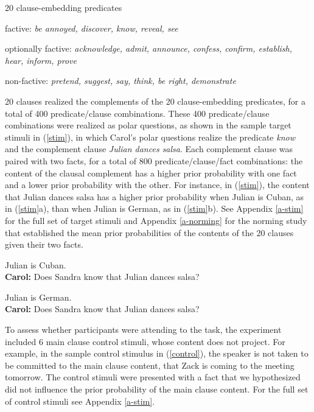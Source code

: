 \documentclass[11pt,fleqn]{article}
\newcommand{\6}{\mbox{$[\hspace*{-.6mm}[$}}
\newcommand{\9}{\mbox{$]\hspace*{-.6mm}]$}}
\begin{document}
\begin{exe}
\ex\label{pred} 20 clause-embedding predicates 

\begin{xlist}

\ex factive: {\em be annoyed, discover, know, reveal, see}

\ex optionally factive: {\em acknowledge, admit, announce, confess, confirm, establish, hear, inform, prove}

\ex non-factive:  {\em pretend, suggest, say, think, be right, demonstrate}

\end{xlist}

\end{exe}

20 clauses realized the complements of the 20 clause-embedding predicates, for a total of 400 predicate/clause combinations. These 400 predicate/clause combinations were realized as polar questions, as shown in the sample target stimuli in (\ref{stim}), in which Carol's polar questions realize the predicate {\em know} and the complement clause {\em Julian dances salsa}. Each complement clause was paired with two facts, for a total of 800 predicate/clause/fact combinations: the content of the clausal complement has a higher prior probability with one fact and a lower prior probability with the other. For instance, in (\ref{stim}), the content that Julian dances salsa has a higher prior probability when Julian is Cuban, as in (\ref{stim}a), than when Julian is German, as in (\ref{stim}b). See Appendix \ref{a-stim} for the full set of target stimuli and Appendix \ref{a-norming} for the norming study that established the mean prior probabilities of the contents of the 20 clauses given their two facts. 
 
\begin{exe}
\ex\label{stim}
\begin{xlist}
 Julian is Cuban.  \\ 
{\bf Carol:} Does Sandra know that Julian dances salsa?

 Julian is German.  \\ 
{\bf Carol:} Does Sandra know that Julian dances salsa?
\end{xlist}
\end{exe}
To assess whether participants were attending to the task, the experiment included 6 main clause control stimuli, whose content does not project. For example, in the sample control stimulus in (\ref{control}), the speaker is not taken to be committed to the main clause content, that Zack is coming to the meeting tomorrow. The control stimuli were presented with a fact that we hypothesized did not influence the prior probability of the main clause content. For the full set of control stimuli see Appendix \ref{a-stim}.
\end{document}
